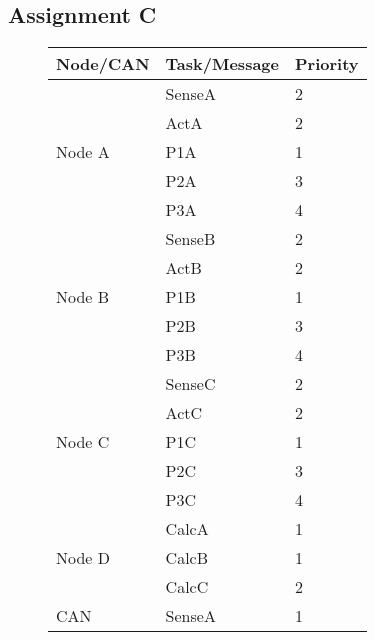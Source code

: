     \subsection{Assignment C}
    \renewcommand{\arraystretch}{1.4}
    \begin{figure}[H]
    \centering
    \begin{minipage}{0.5\textwidth}
        \begin{table}[H]
        \centering
            \begin{tabular}{|l|l|l|}
            \hline
            \rowcolor{green!40}\textbf{Node/CAN} & \textbf{Task/Message} & \textbf{Priority}   \\ \hline
            \multirow{5}{*}{Node A}     & SenseA    & 2 \\
                                        & ActA      & 2 \\ 
                                        & P1A       & 1 \\
                                        & P2A       & 3 \\
                                        & P3A       & 4 \\ \hline
            \multirow{5}{*}{Node B}     & SenseB    & 2 \\
                                        & ActB      & 2 \\ 
                                        & P1B       & 1 \\
                                        & P2B       & 3 \\
                                        & P3B       & 4 \\ \hline
            \multirow{5}{*}{Node C}     & SenseC    & 2 \\
                                        & ActC      & 2 \\ 
                                        & P1C       & 1 \\
                                        & P2C       & 3 \\
                                        & P3C       & 4 \\ \hline
            \multirow{3}{*}{Node D}     & CalcA     & 1 \\
                                        & CalcB     & 1 \\ 
                                        & CalcC     & 2 \\ \hline
            \multirow{6}{*}{CAN}        & SenseA    & 1 \\

\end{tabular}
\end{table}
\end{minipage}
\end{figure}
